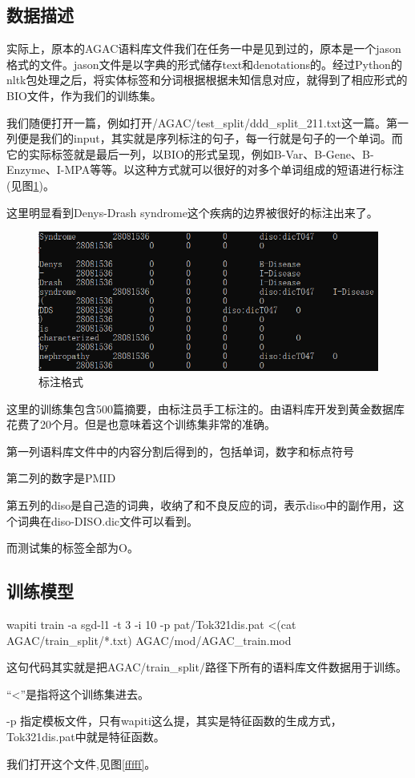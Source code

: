 \documentclass[12pt]{article}
\begin{document}
\subsection{数据描述}
实际上，原本的AGAC语料库文件我们在任务一中是见到过的，原本是一个jason格式的文件。jason文件是以字典的形式储存text和denotations的。经过Python的nltk包处理之后，将实体标签和分词根据根据未知信息对应，就得到了相应形式的BIO文件，作为我们的训练集。\par
我们随便打开一篇，例如打开/AGAC/test\_split/ddd\_split\_211.txt这一篇。第一列便是我们的input，其实就是序列标注的句子，每一行就是句子的一个单词。而它的实际标签就是最后一列，以BIO的形式呈现，例如B-Var、B-Gene、B-Enzyme、I-MPA等等。以这种方式就可以很好的对多个单词组成的短语进行标注(见图\ref{xxxww})。\par
这里明显看到Denys-Drash syndrome这个疾病的边界被很好的标注出来了。\par
\begin{figure}[H]
  \centering
  \includegraphics[scale=0.6]{./picture/form.png} %
  \caption{标注格式} %
  \label{xxxww} %
\end{figure}

这里的训练集包含500篇摘要，由标注员手工标注的。由语料库开发到黄金数据库花费了20个月。但是也意味着这个训练集非常的准确。\par
第一列语料库文件中的内容分割后得到的，包括单词，数字和标点符号\par
第二列的数字是PMID\par
第五列的diso是自己造的词典，收纳了和不良反应的词，表示diso中的副作用，这个词典在diso-DISO.dic文件可以看到。\par
而测试集的标签全部为O。
\subsection{训练模型}
wapiti train -a sgd-l1 -t 3 -i 10 -p pat/Tok321dis.pat <(cat AGAC/train\_split/*.txt) AGAC/mod/AGAC\_train.mod \par
这句代码其实就是把AGAC/train\_split/路径下所有的语料库文件数据用于训练。\par
“<”是指将这个训练集进去。\par
-p 指定模板文件，只有wapiti这么提，其实是特征函数的生成方式，Tok321dis.pat中就是特征函数。\par
我们打开这个文件,见图\ref{fffff}。
\end{document}
